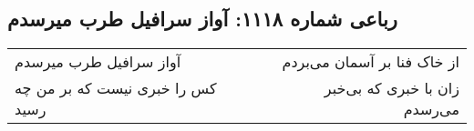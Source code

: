\begin{center}
\section*{رباعی شماره ۱۱۱۸: آواز سرافیل طرب میرسدم}
\label{sec:1118}
\begin{longtable}{l p{0.5cm} r}
آواز سرافیل طرب میرسدم
&&
از خاک فنا بر آسمان می‌بردم
\\
کس را خبری نیست که بر من چه رسید
&&
زان با خبری که بی‌خبر می‌رسدم
\\
\end{longtable}
\end{center}
